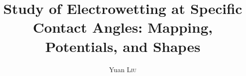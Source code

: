 \documentclass[a4paper,12pt]{report}
\title{Study of Electrowetting at Specific Contact Angles: Mapping, Potentials, and Shapes}
\author{Yuan \textsc{Liu}}
\begin{document}
\onehalfspacing%
\pagestyle{fancy}

\maketitle

%
%
%
%
%
%
\pagestyle{plain}

\begin{declaration}
\end{declaration}

\begin{acknowledgements}
\end{acknowledgements}

\begin{Abstract}
\end{Abstract}

\setcounter{tocdepth}{3}%
\tableofcontents
\newpage
\printnomenclature

\fancyhead[L]{\leftmark}
\fancyhead[C]{}
\fancyhead[R]{}
\fancyfoot[C]{\thepage}
\thispagestyle{empty}
\pagestyle{fancy}


\doublespacing
\clearpage








\pagebreak
{}




\appendix




\end{document}
